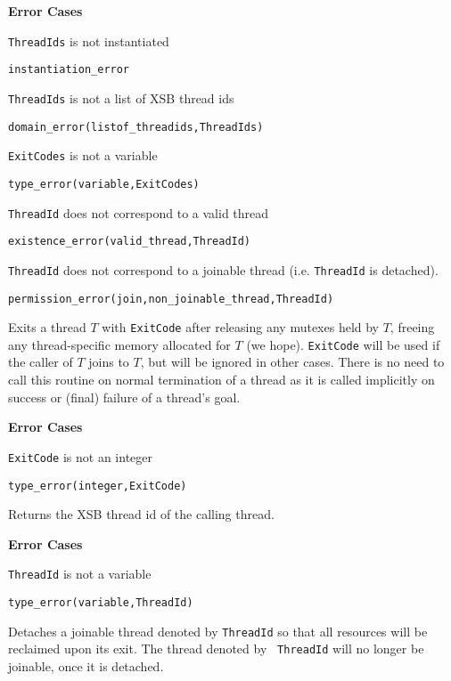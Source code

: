 \begin{description}
{\bf Error Cases}
\bi
\item 	{\tt ThreadIds} is not instantiated
\bi
\item 	{\tt instantiation\_error}
\ei
%
\item 	{\tt ThreadIds} is not a list of XSB thread ids
\bi
\item 	{\tt domain\_error(listof\_threadids,ThreadIds)}
\ei
%
\item 	{\tt ExitCodes} is not a variable
\bi
\item 	{\tt type\_error(variable,ExitCodes)}
\ei
%
\item   {\tt ThreadId} does not correspond to a valid thread
\bi
\item   {\tt existence\_error(valid\_thread,ThreadId)}
\ei
\item   {\tt ThreadId} does not correspond to a joinable thread
  (i.e. {\tt ThreadId} is detached).
\bi
\item   {\tt permission\_error(join,non\_joinable\_thread,ThreadId)}
\ei
\ei


%
Exits a thread $T$ with {\tt ExitCode} after releasing any mutexes
held by $T$, freeing any thread-specific memory allocated for $T$ (we
hope).  {\tt ExitCode} will be used if the caller of $T$ joins to $T$,
but will be ignored in other cases.  There is no need to call this
routine on normal termination of a thread as it is called implicitly
on success or (final) failure of a thread's goal.

{\bf Error Cases}
\bi
\item 	{\tt ExitCode} is not an integer
\bi
\item 	{\tt type\_error(integer,ExitCode)}
\ei
\ei

%
Returns the XSB thread id of the calling thread.

{\bf Error Cases}
\bi
\item 	{\tt ThreadId} is not a variable
\bi
\item 	{\tt type\_error(variable,ThreadId)}
\ei
\ei

%
Detaches a joinable thread denoted by {\tt ThreadId} so that all
resources will be reclaimed upon its exit.  The thread denoted by {\tt
  ThreadId} will no longer be joinable, once it is detached.


\end{description}
